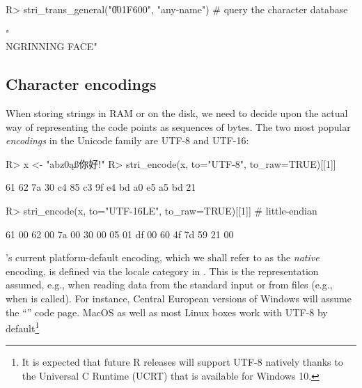 \documentclass[nojss]{jss}
\begin{document}
\begin{Schunk}
\begin{Sinput}
R> stri_trans_general("\U001F600", "any-name") # query the character database
\end{Sinput}
\begin{Soutput}
[1] "\\N{GRINNING FACE}"
\end{Soutput}
\end{Schunk}



%
%




\subsection{Character encodings}\label{Sec:encoding}

When storing strings in RAM or on the disk,
we need to decide upon the actual way
of representing the code points as sequences of bytes.
The two most popular \textit{encodings} in the Unicode family are
UTF-8 and UTF-16:

\begin{Schunk}
\begin{Sinput}
R> x <- "abz0ąß你好!"
R> stri_encode(x, to="UTF-8", to_raw=TRUE)[[1]]
\end{Sinput}
\begin{Soutput}
 [1] 61 62 7a 30 c4 85 c3 9f e4 bd a0 e5 a5 bd 21
\end{Soutput}
\begin{Sinput}
R> stri_encode(x, to="UTF-16LE", to_raw=TRUE)[[1]]  # little-endian
\end{Sinput}
\begin{Soutput}
 [1] 61 00 62 00 7a 00 30 00 05 01 df 00 60 4f 7d 59 21 00
\end{Soutput}
\end{Schunk}

's current platform-default encoding, which we shall
refer to as the \textit{native} encoding, is defined via the
 locale category in
. This is the representation assumed,
e.g., when reading data from the standard input
or from files (e.g., when  is called).
For instance, Central European versions of Windows will assume
the ``'' code page.
MacOS as well as most Linux boxes work with UTF-8 by default\footnote{
It is expected that future R releases will support UTF-8 natively
thanks to the Universal C Runtime (UCRT) that is available for Windows 10.
}
\end{document}
